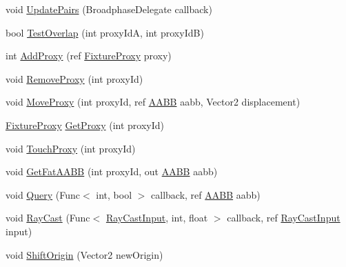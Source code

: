 \begin{DoxyCompactItemize}
\item 
void \hyperlink{interface_farseer_physics_1_1_collision_1_1_i_broad_phase_a1830419926dabd7a7bf8bd729e18e587}{Update\+Pairs} (Broadphase\+Delegate callback)
\item 
bool \hyperlink{interface_farseer_physics_1_1_collision_1_1_i_broad_phase_a8417109442db0a81b8eeac2df1de06e5}{Test\+Overlap} (int proxy\+Id\+A, int proxy\+Id\+B)
\item 
int \hyperlink{interface_farseer_physics_1_1_collision_1_1_i_broad_phase_a0a10f642ab61c295d503f2c0ec1cc3db}{Add\+Proxy} (ref \hyperlink{struct_farseer_physics_1_1_dynamics_1_1_fixture_proxy}{Fixture\+Proxy} proxy)
\item 
void \hyperlink{interface_farseer_physics_1_1_collision_1_1_i_broad_phase_ad3218d272893ffb2cebeb4cc99c953c4}{Remove\+Proxy} (int proxy\+Id)
\item 
void \hyperlink{interface_farseer_physics_1_1_collision_1_1_i_broad_phase_a33a57dd335b8534c6fbc10623acca7b4}{Move\+Proxy} (int proxy\+Id, ref \hyperlink{struct_farseer_physics_1_1_collision_1_1_a_a_b_b}{A\+A\+B\+B} aabb, Vector2 displacement)
\item 
\hyperlink{struct_farseer_physics_1_1_dynamics_1_1_fixture_proxy}{Fixture\+Proxy} \hyperlink{interface_farseer_physics_1_1_collision_1_1_i_broad_phase_ab04dd33ba989359a44e932fd1a211df1}{Get\+Proxy} (int proxy\+Id)
\item 
void \hyperlink{interface_farseer_physics_1_1_collision_1_1_i_broad_phase_aa30e889a670f0920021439edeade01eb}{Touch\+Proxy} (int proxy\+Id)
\item 
void \hyperlink{interface_farseer_physics_1_1_collision_1_1_i_broad_phase_a73d46eff2cc512bb99065f9c747ae956}{Get\+Fat\+A\+A\+B\+B} (int proxy\+Id, out \hyperlink{struct_farseer_physics_1_1_collision_1_1_a_a_b_b}{A\+A\+B\+B} aabb)
\item 
void \hyperlink{interface_farseer_physics_1_1_collision_1_1_i_broad_phase_aec8aff4b9a324f4cf1ecaca3fd0d39f9}{Query} (Func$<$ int, bool $>$ callback, ref \hyperlink{struct_farseer_physics_1_1_collision_1_1_a_a_b_b}{A\+A\+B\+B} aabb)
\item 
void \hyperlink{interface_farseer_physics_1_1_collision_1_1_i_broad_phase_a1e7ed0c5de3fdb3e21230c6b255f60bf}{Ray\+Cast} (Func$<$ \hyperlink{struct_farseer_physics_1_1_collision_1_1_ray_cast_input}{Ray\+Cast\+Input}, int, float $>$ callback, ref \hyperlink{struct_farseer_physics_1_1_collision_1_1_ray_cast_input}{Ray\+Cast\+Input} input)
\item 
void \hyperlink{interface_farseer_physics_1_1_collision_1_1_i_broad_phase_a3a77c45767b553b406004ff2a9382a16}{Shift\+Origin} (Vector2 new\+Origin)
\end{DoxyCompactItemize}
